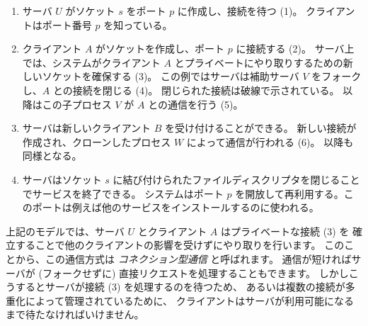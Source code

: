 \begin{enumerate}
\item
  サーバ $U$ がソケット $s$ をポート $p$ に作成し、接続を待つ (1)。
  クライアントはポート番号 $p$ を知っている。
%
\item
  クライアント $A$ がソケットを作成し、ポート $p$ に接続する (2)。
  サーバ上では、システムがクライアント $A$ とプライベートにやり取りするための新しいソケットを確保する (3)。
  この例ではサーバは補助サーバ $V$ をフォークし、$A$ との接続を閉じる (4)。 閉じられた接続は破線で示されている。
  以降はこの子プロセス $V$ が $A$ との通信を行う (5)。
%
\item
  サーバは新しいクライアント $B$ を受け付けることができる。
  新しい接続が作成され、クローンしたプロセス $W$ によって通信が行われる (6)。
  以降も同様となる。
%
\item
  サーバはソケット $s$ に結び付けられたファイルディスクリプタを閉じることでサービスを終了できる。
  システムはポート $p$ を開放して再利用する。このポートは例えば他のサービスをインストールするのに使われる。

\end{enumerate}

上記のモデルでは、サーバ $U$ とクライアント $A$ はプライベートな接続 (3) を
確立することで他のクライアントの影響を受けずにやり取りを行います。
このことから、この通信方式は \emph{コネクション型通信} と呼ばれます。
通信が短ければサーバが (フォークせずに) 直接リクエストを処理することもできます。
しかしこうするとサーバが接続 (3) を処理するのを待つため、
あるいは複数の接続が多重化によって管理されているために、
クライアントはサーバが利用可能になるまで待たなければいけません。

